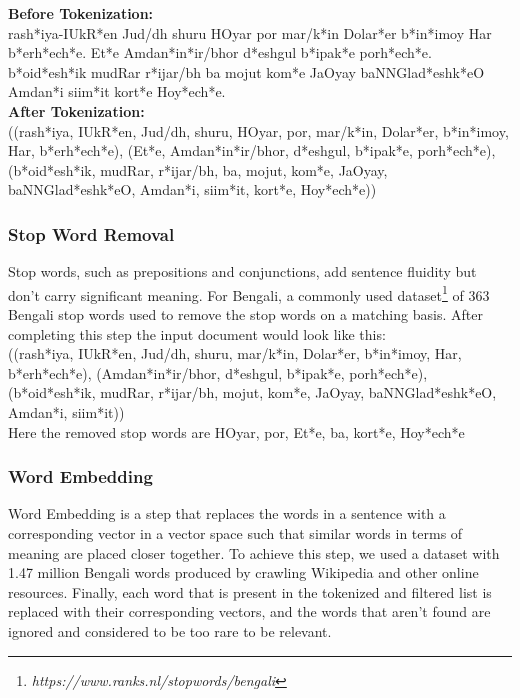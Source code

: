 \textbf{Before Tokenization:}\\
{\bng
    ra\*sh*iya-IU\*kR*en Jud/dh shuru HOyar por ma\*r/k*in Dola\*r*er \*b*i\*n*imoy Har \*b*e\*rh*e\*ch*e.
    E\*t*e Amda\*n*i\*n*ir/bhor \*d*eshgul \*b*ipa\*k*e po\*rh*e\*ch*e.
    \*b*{oi}\*d*e\*sh*ik mudRar \*r*ijar/bh ba mojut ko\*m*e JaOyay baNNGla\*d*esh\*k*eO Amda\*n*i sii\*m*it
    kor\*t*e Ho\*y*e\*ch*e.
}\\

\textbf{After Tokenization:}\\
{\bng
    ((ra\*sh*iya, IU\*kR*en, Jud/dh, shuru, HOyar, por, ma\*r/k*in, Dola\*r*er, \*b*i\*n*imoy, Har, \*b*e\*rh*e\*ch*e),
    (E\*t*e, Amda\*n*i\*n*ir/bhor, \*d*eshgul, \*b*ipa\*k*e, po\*rh*e\*ch*e),
    (\*b*{oi}\*d*e\*sh*ik, mudRar, \*r*ijar/bh, ba, mojut, ko\*m*e, JaOyay, baNNGla\*d*esh\*k*eO, Amda\*n*i,
    sii\*m*it, kor\*t*e, Ho\*y*e\*ch*e))
}

\subsubsection{Stop Word Removal}

Stop words, such as prepositions and conjunctions, add sentence fluidity but don’t carry significant meaning.
For Bengali, a commonly used dataset\footnote{\textit{https://www.ranks.nl/stopwords/bengali}} of 363 Bengali stop
words used to remove the stop words on a matching basis.
After completing this step the input document would look like this:\\
{\bng
    ((ra\*sh*iya, IU\*kR*en, Jud/dh, shuru, ma\*r/k*in, Dola\*r*er, \*b*i\*n*imoy, Har, \*b*e\*rh*e\*ch*e),
    (Amda\*n*i\*n*ir/bhor, \*d*eshgul, \*b*ipa\*k*e, po\*rh*e\*ch*e),
    (\*b*{oi}\*d*e\*sh*ik, mudRar, \*r*ijar/bh, mojut, ko\*m*e, JaOyay, baNNGla\*d*esh\*k*eO, Amda\*n*i, sii\*m*it))
}\\
Here the removed stop words are {\bng HOyar, por, E\*t*e, ba, kor\*t*e, Ho\*y*e\*ch*e}

\subsubsection{Word Embedding}
Word Embedding is a step that replaces the words in a sentence with a corresponding vector in a vector
space such that similar words in terms of meaning are placed closer together.
To achieve this step, we used a dataset with 1.47 million Bengali words produced by \citeauthor{grave-etal-2018-fasttext}
\cite{grave-etal-2018-fasttext}crawling Wikipedia and other online resources.
Finally, each word that is present in the tokenized and filtered list is replaced with their
corresponding vectors, and the words that aren't found are ignored and considered to be too rare to be relevant.



